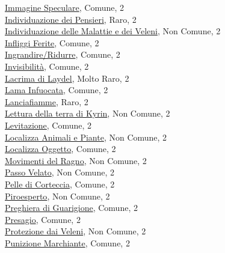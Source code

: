 \begin{multicols}{3}
{{\hyperlink{Immagine Speculare}{Immagine Speculare}, Comune, 2\\
\hyperlink{Individuazione dei Pensieri}{Individuazione dei Pensieri}, Raro, 2\\
\hyperlink{Individuazione delle Malattie e dei Veleni}{Individuazione delle Malattie e dei Veleni}, Non Comune, 2\\
\hyperlink{Infliggi Ferite}{Infliggi Ferite}, Comune, 2\\
\hyperlink{Ingrandire/Ridurre}{Ingrandire/Ridurre}, Comune, 2\\
\hyperlink{Invisibilità}{Invisibilità}, Comune, 2\\
\hyperlink{Lacrima di Laydel}{Lacrima di Laydel}, Molto Raro, 2\\
\hyperlink{Lama Infuocata}{Lama Infuocata}, Comune, 2\\
\hyperlink{Lanciafiamme}{Lanciafiamme}, Raro, 2\\
\hyperlink{Lettura della terra di Kyrin}{Lettura della terra di Kyrin}, Non Comune, 2\\
\hyperlink{Levitazione}{Levitazione}, Comune, 2\\
\hyperlink{Localizza Animali e Piante}{Localizza Animali e Piante}, Non Comune, 2\\
\hyperlink{Localizza Oggetto}{Localizza Oggetto}, Comune, 2\\
\hyperlink{Movimenti del Ragno}{Movimenti del Ragno}, Non Comune, 2\\
\hyperlink{Passo Velato}{Passo Velato}, Non Comune, 2\\
\hyperlink{Pelle di Corteccia}{Pelle di Corteccia}, Comune, 2\\
\hyperlink{Piroesperto}{Piroesperto}, Non Comune, 2\\
\hyperlink{Preghiera di Guarigione}{Preghiera di Guarigione}, Comune, 2\\
\hyperlink{Presagio}{Presagio}, Comune, 2\\
\hyperlink{Protezione dai Veleni}{Protezione dai Veleni}, Non Comune, 2\\
\hyperlink{Punizione Marchiante}{Punizione Marchiante}, Comune, 2\\
}}
\end{multicols}
